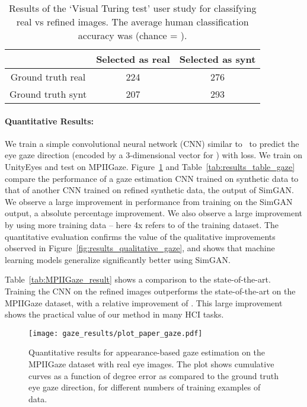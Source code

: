 \documentclass[10pt,twocolumn,letterpaper]{article}
\begin{document}
\begin{table}[t]
\centering
\begin{tabular}{|c|c|c|} \hline
&Selected as real & Selected as synt \\ \hline
Ground truth real & 224 & 276 \\ \hline
Ground truth synt & 207 & 293 \\ \hline
\end{tabular}
\caption{Results of the `Visual Turing test' user study for classifying  real vs  refined images.
The average human classification accuracy was  (chance = ). 
}
\label{tab:results_gaze_turing}
\end{table}





\vspace{-0.2in}
\paragraph{Quantitative Results:}
We train a simple convolutional neural network (CNN) similar to~\cite{Zhang15a} to predict the eye gaze direction (encoded by a 3-dimensional vector for ) with  loss. We train on UnityEyes and test on MPIIGaze.
Figure~\ref{fig:results_plots_gaze} and Table~\ref{tab:results_table_gaze} compare the performance of a gaze estimation CNN trained on synthetic data to that of another CNN trained on refined synthetic data, the output of SimGAN. 
We observe a large improvement in performance from training on the SimGAN output, a  absolute percentage improvement. 
We also observe a large improvement by using more training data -- here 4x refers to  of the training dataset.
The quantitative evaluation confirms the value of the qualitative improvements observed in Figure~\ref{fig:results_qualitative_gaze}, and shows that machine learning models generalize significantly better using SimGAN.

Table~\ref{tab:MPIIGaze_result} shows a comparison to the state-of-the-art.
Training the CNN on the refined images outperforms the state-of-the-art on the MPIIGaze dataset, with a relative improvement of .
This large improvement shows the practical value of our method in many HCI tasks.







\begin{figure}
\centering
\texttt{[image: gaze\_results/plot\_paper\_gaze.pdf]} 
\caption{Quantitative results for appearance-based gaze estimation on the MPIIGaze dataset with real eye images.  
The plot shows cumulative curves as a function of degree error as compared to the ground truth eye gaze direction, for different numbers of training examples of data.
}
\label{fig:results_plots_gaze}
\end{figure}
\end{document}
